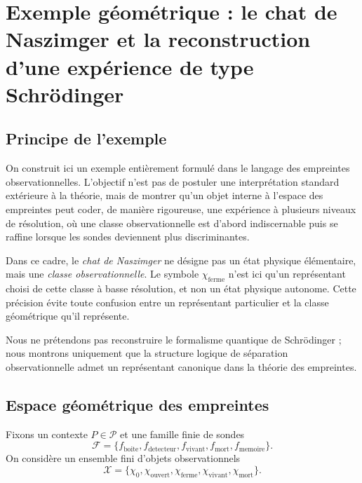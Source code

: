 \documentclass[11pt,a4paper,openany]{book}
\begin{document}
\section{Exemple géométrique : le chat de Naszimger et la reconstruction d'une expérience de type Schrödinger}

\subsection{Principe de l'exemple}

On construit ici un exemple entièrement formulé dans le langage des empreintes observationnelles. L'objectif n'est pas de postuler une interprétation standard extérieure à la théorie, mais de montrer qu'un objet interne à l'espace des empreintes peut coder, de manière rigoureuse, une expérience à plusieurs niveaux de résolution, où une classe observationnelle est d'abord indiscernable puis se raffine lorsque les sondes deviennent plus discriminantes.

Dans ce cadre, le \emph{chat de Naszimger} ne désigne pas un état physique élémentaire, mais une \emph{classe observationnelle}. Le symbole \(\chi_{\mathrm{ferme}}\) n'est ici qu'un représentant choisi de cette classe à basse résolution, et non un état physique autonome. Cette précision évite toute confusion entre un représentant particulier et la classe géométrique qu'il représente.

Nous ne prétendons pas reconstruire le formalisme quantique de Schrödinger ; nous montrons uniquement que la structure logique de séparation observationnelle admet un représentant canonique dans la théorie des empreintes.

\subsection{Espace géométrique des empreintes}

Fixons un contexte \(P\in\mathcal P\) et une famille finie de sondes
\[
\mathcal F=
\{f_{\mathrm{boite}},f_{\mathrm{detecteur}},f_{\mathrm{vivant}},f_{\mathrm{mort}},f_{\mathrm{memoire}}\}.
\]
On considère un ensemble fini d'objets observationnels
\[
\mathcal X=
\{\chi_0,\chi_{\mathrm{ouvert}},\chi_{\mathrm{ferme}},\chi_{\mathrm{vivant}},\chi_{\mathrm{mort}}\}.
\]
\end{document}
